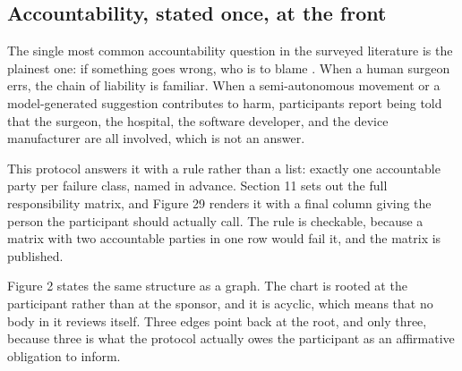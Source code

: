 \vspace{-0.7cm}

\subsection{Accountability, stated once, at the front}

The single most common accountability question in the surveyed literature is
the plainest one: if something goes wrong, who is to blame
\cite{Jauniaux2025, BrarRAS2024X, WuSemiAI2026}. When a human surgeon errs, the
chain of liability is familiar. When a semi-autonomous movement or a
model-generated suggestion contributes to harm, participants report being told
that the surgeon, the hospital, the software developer, and the device
manufacturer are all involved, which is not an answer.

This protocol answers it with a rule rather than a list: exactly one accountable
party per failure class, named in advance. Section 11 sets out the full
responsibility matrix, and Figure 29 renders it with a final column giving the
person the participant should actually call. The rule is checkable, because a
matrix with two accountable parties in one row would fail it, and the matrix is
published.

Figure 2 states the same structure as a graph. The chart is rooted at the
participant rather than at the sponsor, and it is acyclic, which means that no
body in it reviews itself. Three edges point back at the root, and only three,
because three is what the protocol actually owes the participant as an
affirmative obligation to inform.

